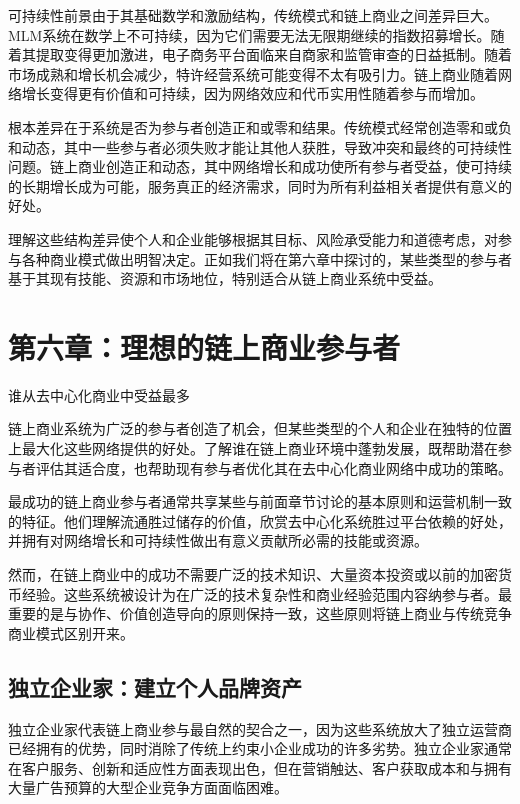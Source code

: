 \documentclass[
  Letterpaper,
]{scrbook}
\begin{document}
可持续性前景由于其基础数学和激励结构，传统模式和链上商业之间差异巨大。MLM系统在数学上不可持续，因为它们需要无法无限期继续的指数招募增长。随着其提取变得更加激进，电子商务平台面临来自商家和监管审查的日益抵制。随着市场成熟和增长机会减少，特许经营系统可能变得不太有吸引力。链上商业随着网络增长变得更有价值和可持续，因为网络效应和代币实用性随着参与而增加。

根本差异在于系统是否为参与者创造正和或零和结果。传统模式经常创造零和或负和动态，其中一些参与者必须失败才能让其他人获胜，导致冲突和最终的可持续性问题。链上商业创造正和动态，其中网络增长和成功使所有参与者受益，使可持续的长期增长成为可能，服务真正的经济需求，同时为所有利益相关者提供有意义的好处。

理解这些结构差异使个人和企业能够根据其目标、风险承受能力和道德考虑，对参与各种商业模式做出明智决定。正如我们将在第六章中探讨的，某些类型的参与者基于其现有技能、资源和市场地位，特别适合从链上商业系统中受益。

\chapter{第六章：理想的链上商业参与者}\label{sec-ideal-participants}

谁从去中心化商业中受益最多

链上商业系统为广泛的参与者创造了机会，但某些类型的个人和企业在独特的位置上最大化这些网络提供的好处。了解谁在链上商业环境中蓬勃发展，既帮助潜在参与者评估其适合度，也帮助现有参与者优化其在去中心化商业网络中成功的策略。

最成功的链上商业参与者通常共享某些与前面章节讨论的基本原则和运营机制一致的特征。他们理解流通胜过储存的价值，欣赏去中心化系统胜过平台依赖的好处，并拥有对网络增长和可持续性做出有意义贡献所必需的技能或资源。

然而，在链上商业中的成功不需要广泛的技术知识、大量资本投资或以前的加密货币经验。这些系统被设计为在广泛的技术复杂性和商业经验范围内容纳参与者。最重要的是与协作、价值创造导向的原则保持一致，这些原则将链上商业与传统竞争商业模式区别开来。

\section{独立企业家：建立个人品牌资产}\label{ux72ecux7acbux4f01ux4e1aux5bb6ux5efaux7acbux4e2aux4ebaux54c1ux724cux8d44ux4ea7}

独立企业家代表链上商业参与最自然的契合之一，因为这些系统放大了独立运营商已经拥有的优势，同时消除了传统上约束小企业成功的许多劣势。独立企业家通常在客户服务、创新和适应性方面表现出色，但在营销触达、客户获取成本和与拥有大量广告预算的大型企业竞争方面面临困难。
\end{document}
